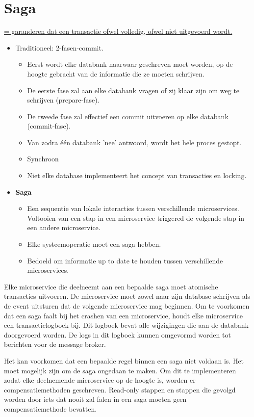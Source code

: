 	\chapter{Saga}
	\uline{= garanderen dat een transactie ofwel volledig, ofwel niet uitgevoerd wordt.}
	\begin{itemize}
		\item[\info] Traditioneel: 2-fasen-commit.
		\begin{itemize}
			\item[\info] Eerst wordt elke databank naarwaar geschreven moet worden, op de hoogte gebracht van de informatie die ze moeten schrijven.
			\item[\info] De eerste fase zal aan elke databank vragen of zij klaar zijn om weg te schrijven (prepare-fase).
			\item[\info] De tweede fase zal effectief een commit uitvoeren op elke databank (commit-fase).
			\item[\info] Van zodra één databank 'nee' antwoord, wordt het hele proces gestopt.
			\item[\alert] Synchroon
			\item[\alert] Niet elke database implementeert het concept van transacties en locking.
		\end{itemize}
		\item[\info] \textbf{Saga}
		\begin{itemize}
			\item[\info] Een sequentie van lokale interacties tussen verschillende microservices. Voltooien van een stap in een microservice triggered de volgende stap in een andere microservice.
			\item[\info] Elke systeemoperatie moet een saga hebben.
			\item[\info] Bedoeld om informatie up to date te houden tussen verschillende microservices.
		\end{itemize}
	\end{itemize}

	Elke microservice die deelneemt aan een bepaalde saga moet atomische transacties uitvoeren. De microservice moet zowel naar zijn database schrijven als de event uitsturen dat de volgende microservice mag beginnen. Om te voorkomen dat een saga faalt bij het crashen van een microservice, houdt elke microservice een transactielogboek bij. Dit logboek bevat alle wijzigingen die aan de databank doorgevoerd worden. De logs in dit logboek kunnen omgevormd worden tot berichten voor de message broker. 

	Het kan voorkomen dat een bepaalde regel binnen een saga niet voldaan is. Het moet mogelijk zijn om de saga ongedaan te maken. Om dit te implementeren zodat elke deelnemende microservice op de hoogte is, worden er compensatiemethoden geschreven. Read-only stappen en stappen die gevolgd worden door iets dat nooit zal falen in een saga moeten geen compensatiemethode bevatten.

